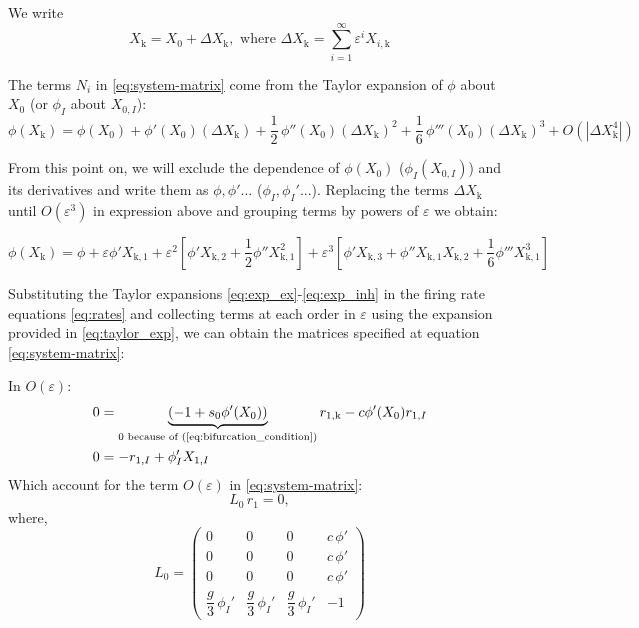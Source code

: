 \documentclass[12,twoside]{TFG-GM}
\theoremstyle{definition}
\theoremstyle{remark}
\newcommand{\kk}{\mathrm{k}}
\begin{document}
We write
\[
X_\kk = X_0 + \Delta X_\kk, \text{ where } \Delta X_\kk = \sum_{i=1}^\infty\varepsilon^i X_{i,\kk}
\]

The terms $N_i$ in \eqref{eq:system-matrix} come from the Taylor expansion of $\phi$ about $X_{0}$ (or $\phi_I$ about $X_{0,I}$):
\begin{equation}
\phi(X_\kk ) = \phi(X_0) + \phi'(X_0) (\Delta X_\kk ) + \frac{1}{2}\,\phi''(X_0) (\Delta X_\kk )^2 +\frac{1}{6}\,\phi'''(X_0) (\Delta X_\kk )^3+ O(\left|\Delta X_\kk ^4\right|)
\end{equation}


From this point on, we will exclude the dependence of $\phi(X_0)$ ($\phi_I(X_{0,I})$) and its derivatives and write them as $\phi, \phi'...$ ($\phi_I, \phi_I'...$). Replacing the terms $\Delta X_\kk$ until $O(\varepsilon^3)$ in expression above and grouping terms by powers of $\varepsilon$ we obtain:

\begin{equation} %
\phi(X_\kk )  = \phi + \varepsilon \phi' X_{\kk ,1} + \varepsilon^2 [\phi' X_{\kk ,2} + \frac12 \phi'' X_{\kk ,1}^2]+ \varepsilon^3 [\phi' X_{\kk ,3} + \phi'' X_{\kk ,1}X_{\kk ,2} +\frac16 \phi''' X_{\kk ,1}^3]
\label{eq:taylor_exp}
\end{equation}
\bigskip 

Substituting the Taylor expansions \eqref{eq:exp_ex}-\eqref{eq:exp_inh} in the firing rate equations \eqref{eq:rates} and collecting terms at each order in $\varepsilon$ using the expansion provided in \eqref{eq:taylor_exp}, we can obtain the matrices specified at equation \eqref{eq:system-matrix}:



In \(O(\varepsilon)\):
\begin{equation}
\begin{aligned}
0 & = \underbrace{(-1+s_{0} \phi'(X_0))}_{0 \text{ because of (\ref{eq:bifurcation_condition})}} r_{1,\kk } - c\phi'(X_0)r_{1,I}\\
0 & = -r_{1,I} + \phi_I'X_{1,I}
  \end{aligned}
\end{equation}
Which account for the term $O(\varepsilon)$ in \eqref{eq:system-matrix}:
\begin{equation}
L_0\,r_1 = 0,
\label{eq:o1-matrix}
\end{equation}
where, 
\begin{equation}
  L_0 = \begin{pmatrix}
    0 & 0 & 0 & c\,\phi' \\[2mm]
    0 & 0 & 0 & c\,\phi' \\[2mm]
    0 & 0 & 0 & c\,\phi' \\[2mm]
    \dfrac{g}{3}\,\phi_I' & \dfrac{g}{3}\,\phi_I' & \dfrac{g}{3}\,\phi_I' & -1
  \end{pmatrix}
  \label{eq:L0_matrix}
\end{equation}
\end{document}
